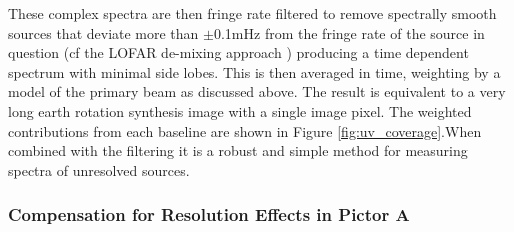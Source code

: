 \documentclass[preprint]{aastex}
\begin{document}
 These complex spectra are then fringe rate filtered to remove spectrally
smooth sources that deviate more than $\pm$0.1mHz from the fringe rate of the source in question
 \citep{Parsons:2009p7859} (cf the LOFAR
de-mixing approach \cite{Offringa:2012p9691})  producing a time dependent
spectrum with minimal side lobes. This is then averaged in time,  weighting by a model of the primary
beam as discussed above.
The result is equivalent to
a very long earth rotation synthesis image with a single image pixel. The weighted
contributions from each baseline are shown in Figure \ref{fig:uv_coverage}.When
combined with the filtering it is a robust and simple method for measuring
spectra of unresolved sources. 


\subsubsection{Compensation for Resolution Effects in Pictor A}
\end{document}
